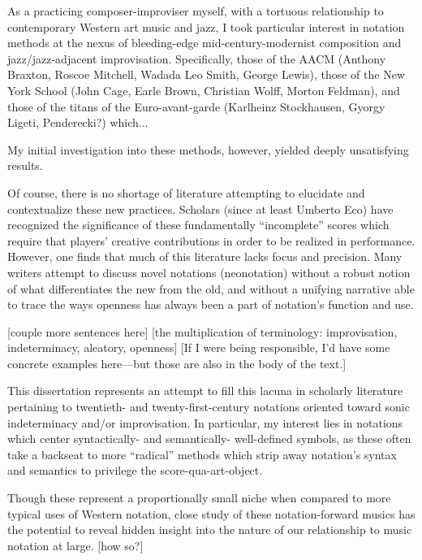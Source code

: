 \begin{notestuff}
\end{notestuff}

As a practicing composer-improviser myself, with a tortuous relationship to contemporary Western art music and jazz, I took particular interest in notation methods at the nexus of bleeding-edge mid-century-modernist composition and jazz/jazz-adjacent improvisation.
Specifically, those of the AACM (Anthony Braxton, Roscoe Mitchell, Wadada Leo Smith, George Lewis), those of the New York School (John Cage, Earle Brown, Christian Wolff, Morton Feldman), and those of the titans of the Euro-avant-garde (Karlheinz Stockhausen, Gyorgy Ligeti, Penderecki?) which...

My initial investigation into these methods, however, yielded deeply unsatisfying results.

Of course, there is no shortage of literature attempting to elucidate and contextualize these new practices. Scholars (since at least Umberto Eco) have recognized the significance of these fundamentally ``incomplete'' scores which require that players' creative contributions in order to be realized in performance. 
However, one finds that much of this literature lacks focus and precision. Many writers attempt to discuss novel notations (neonotation) without a robust notion of what differentiates the new from the old, and without a unifying narrative able to trace the ways openness has always been a part of notation's function and use.

[couple more sentences here]
[the multiplication of terminology: improvisation, indeterminacy, aleatory, openness]
[If I were being responsible, I'd have some concrete examples here---but those are also in the body of the text.]

This dissertation represents an attempt to fill this lacuna in scholarly literature pertaining to twentieth- and twenty-first-century notations oriented toward sonic indeterminacy and/or improvisation. In particular, my interest lies in notations which center syntactically- and semantically- well-defined symbols, as these often take a backseat to more ``radical'' methods which strip away notation's syntax and semantics to privilege the score-qua-art-object.

Though these represent a proportionally small niche when compared to more typical uses of Western notation, close study of these notation-forward musics has the potential to reveal hidden insight into the nature of our relationship to music notation at large.
[how so?]

